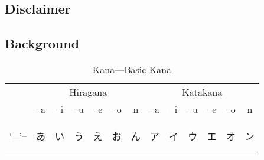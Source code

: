
\subsection*{Disclaimer }  \label{}


\subsection*{Background }  \label{}

\begin{table}[H]
	\centering
	\label{t1}
	\caption{Kana---Basic Kana }
	\begin{tabular}{l|cccccc|cccccc}
		\toprule
          & \multicolumn{6}{c|}{Hiragana} & \multicolumn{6}{c}{Katakana} \\
	      & --a & --i & --u & --e & --o & n & --a & --i & --u & --e & --o & n \\
		\midrule
        `\_'-- & {\begin{CJK}{UTF8}{min} あ \end{CJK}} & {\begin{CJK}{UTF8}{min} い \end{CJK}} & {\begin{CJK}{UTF8}{min} う \end{CJK}} & {\begin{CJK}{UTF8}{min} え \end{CJK}} & {\begin{CJK}{UTF8}{min} お \end{CJK}} & {\begin{CJK}{UTF8}{min} ん \end{CJK}} & {\begin{CJK}{UTF8}{min} ア \end{CJK}} & {\begin{CJK}{UTF8}{min} イ \end{CJK}} & {\begin{CJK}{UTF8}{min} ウ \end{CJK}} & {\begin{CJK}{UTF8}{min} エ \end{CJK}} & {\begin{CJK}{UTF8}{min} オ \end{CJK}} & {\begin{CJK}{UTF8}{min} ン \end{CJK}} \\

\end{tabular}
\end{table}
